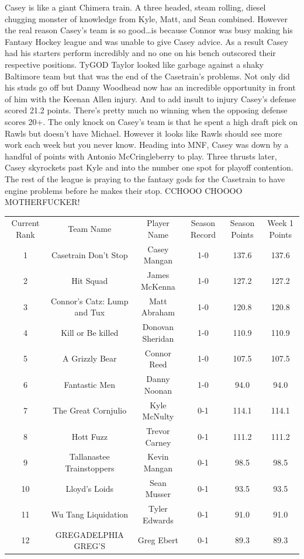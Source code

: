 \documentclass[11pt,letterpaper]{article}
\begin{document}
\par\noindent Casey is like a giant Chimera train. A three headed, steam rolling, diesel chugging monster of knowledge from Kyle, Matt, and Sean combined. However the real reason Casey's team is so good\dots is because Connor was busy making his Fantasy Hockey league and was unable to give Casey advice. As a result Casey had his starters perform incredibly and no one on his bench outscored their respective positions. TyGOD Taylor looked like garbage against a shaky Baltimore team but that was the end of the Casetrain's problems. Not only did his studs go off but Danny Woodhead now has an incredible opportunity in front of him with the Keenan Allen injury.  And to add insult to injury Casey's defense scored 21.2 points. There's pretty much no winning when the opposing defense scores 20+. The only knock on Casey's team is that he spent a high draft pick on Rawls but doesn't have Michael. However it looks like Rawls should see more work each week but you never know. Heading into MNF, Casey was down by a handful of points with Antonio McCringleberry to play. Three thrusts later, Casey skyrockets past Kyle and into the number one spot for playoff contention. The rest of the league is praying to the fantasy gods for the Casetrain to have engine problems before he makes their stop. CCHOOO CHOOOO MOTHERFUCKER!


\newpage
{}
\vspace{-25pt}
\begin{table} [h]
\footnotesize
\begin{center}
\begin{tabular} { c c c c c c }
\\[3mm] Current Rank & Team Name & Player Name & Season Record &  Season Points & Week 1 Points
\\[3mm] 1 & Casetrain Don't Stop & Casey Mangan & 1-0 & 137.6 & 137.6
\\ 2 & Hit Squad & James McKenna & 1-0 & 127.2 & 127.2
\\ 3 & Connor's Catz: Lump and Tux & Matt Abraham & 1-0 & 120.8 & 120.8
\\ 4 & Kill or Be killed & Donovan Sheridan & 1-0 & 110.9 & 110.9
\\ 5 & A Grizzly Bear & Connor Reed & 1-0 & 107.5 & 107.5
\\ 6 & Fantastic Men & Danny Noonan & 1-0 & 94.0 & 94.0
\\ 7 & The Great Cornjulio & Kyle McNulty & 0-1 & 114.1 & 114.1
\\ 8 & Hott Fuzz & Trevor Carney & 0-1 & 111.2 & 111.2
\\ 9 & Tallanastee Trainstoppers & Kevin Mangan & 0-1 & 98.5 & 98.5
\\ 10 & Lloyd's Loids & Sean Musser & 0-1 & 93.5 & 93.5
\\ 11 & Wu Tang Liquidation & Tyler Edwards & 0-1 & 91.0 & 91.0
\\ 12 & GREGADELPHIA GREG'S & Greg Ebert & 0-1 & 89.3 & 89.3
\end{tabular}
\end{center}
\end{table}
\end{document}

